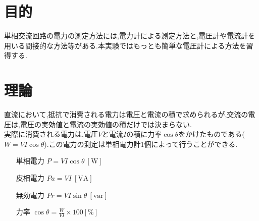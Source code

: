 \documentclass[uplatex]{jsarticle}
\begin{document}
    \section{目的}
        単相交流回路の電力の測定方法には,電力計による測定方法と,電圧計や電流計を用いる間接的な方法等がある.本実験ではもっとも簡単な電圧計による方法を習得する.
    \section{理論}
        直流において,抵抗で消費される電力は電圧と電流の積で求められるが,交流の電圧は,電圧の実効値と電流の実効値の積だけでは決まらない. \\
        実際に消費される電力は,電圧$V$と電流$I$の積に力率$\cos \theta$をかけたものである($W = VI \cos \theta$).この電力の測定は単相電力計1個によって行うことができる.
        \begin{itemize}
            \setlength{\leftskip}{2.5em}
            \item[単相電力]$P = VI \cos \theta \ [\mathrm W]$
            \item[皮相電力]$Pa = VI \ [\mathrm V \mathrm A]$
            \item[無効電力]$Pr = VI \sin \theta \ [\mathrm v \mathrm a \mathrm r]$
            \item[力率　　]$\cos \theta = \frac{W}{VI} \times 100[\%]$
        \end{itemize}
\end{document}
